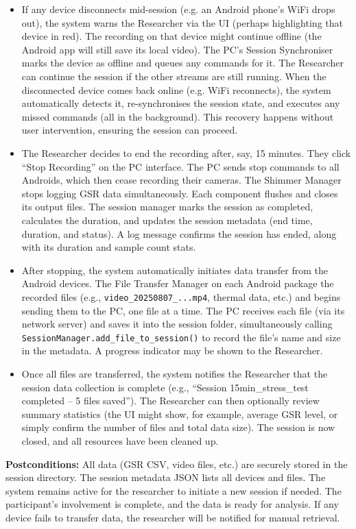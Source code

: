 \begin{itemize}
    \item If any device disconnects mid-session (e.g. an Android phone's WiFi drops out), the system warns the Researcher via the UI (perhaps highlighting that device in red). The recording on that device might continue offline (the Android app will still save its local video). The PC's Session Synchroniser marks the device as offline and queues any commands for it. The Researcher can continue the session if the other streams are still running. When the disconnected device comes back online (e.g. WiFi reconnects), the system automatically detects it, re-synchronises the session state, and executes any missed commands (all in the background). This recovery happens without user intervention, ensuring the session can proceed.
    \item The Researcher decides to end the recording after, say, 15 minutes. They click ``Stop Recording'' on the PC interface. The PC sends stop commands to all Androids, which then cease recording their cameras. The Shimmer Manager stops logging GSR data simultaneously. Each component flushes and closes its output files. The session manager marks the session as completed, calculates the duration, and updates the session metadata (end time, duration, and status). A log message confirms the session has ended, along with its duration and sample count stats.
    \item After stopping, the system automatically initiates data transfer from the Android devices. The File Transfer Manager on each Android package the recorded files (e.g., \texttt{video\_20250807\_...mp4}, thermal data, etc.) and begins sending them to the PC, one file at a time. The PC receives each file (via its network server) and saves it into the session folder, simultaneously calling \texttt{SessionManager.add\_file\_to\_session()} to record the file's name and size in the metadata. A progress indicator may be shown to the Researcher.
    \item Once all files are transferred, the system notifies the Researcher that the session data collection is complete (e.g., ``Session 15min\_stress\_test completed -- 5 files saved''). The Researcher can then optionally review summary statistics (the UI might show, for example, average GSR level, or simply confirm the number of files and total data size). The session is now closed, and all resources have been cleaned up.
\end{itemize}

\textbf{Postconditions:} All data (GSR CSV, video files, etc.) are securely stored in the session directory. The session metadata JSON lists all devices and files. The system remains active for the researcher to initiate a new session if needed. The participant's involvement is complete, and the data is ready for analysis. If any device fails to transfer data, the researcher will be notified for manual retrieval.

